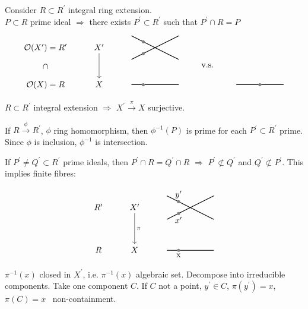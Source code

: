 \documentclass[a4paper,11pt]{article}
\begin{document}
{					Consider $R\subset R^\prime$ integral ring extension.
					\\

					 $P\subset R$ prime ideal $\Longrightarrow$ there exists $P^\prime\subset R^\prime$ such that $P^\prime\cap R=P$
					\begin{equation*}
						\begin{tikzcd}
							\O(X^\prime)=R^\prime \ar[d,phantom,"\rotatebox{90}{$\supset$}",description] & X^\prime\ar[d] & \tikz[baseline=-.1cm]{\draw[thick](-1,.5)--(1,-.5);\draw[thick](-1,-.5)--(1,.5);\draw[thick,gray,fill](-.5,.25)circle[radius=.05cm];\draw[thick,gray,fill](-.5,-.25)circle[radius=.05cm]} & \phantom{l}\ar[d,phantom,"\text{v.s.}",description] & \tikz[baseline=-.1cm]{\draw[thick]plot[smooth] file {plots/xy1.table};\draw[thick]plot[smooth] file {plots/xy2.table}}\\
							\O(X)=R & X & \tikz[baseline=-.1cm]{\draw[thick](-1,0)--(1,0);\draw[thick,gray,fill](-.5,0)circle[radius=.05cm]} & \phantom{l} & \tikz[baseline=-.1cm]{\draw[thick](-1,0)--(1,0);\draw[thick,gray,fill](0,0)circle[radius=.05cm]}
						\end{tikzcd}
					\end{equation*}

					\begin{remark}
						$R\subset R^\prime$ integral extension $\Longrightarrow$ $X^\prime\overset{\pi}{\longrightarrow}X$ surjective.
					\end{remark}

					\begin{remark}
						If $R\overset{\phi}{\longrightarrow}R^\prime$, $\phi$ ring homomorphism, then $\phi^{-1}(P)$ is prime for each $P^\prime\subset R^\prime$ prime. Since $\phi$ is inclusion, $\phi^{-1}$ is intersection.
					\end{remark}

					 If $P^\prime\neq Q^\prime\subset R^\prime$ prime ideals, then $P^\prime\cap R=Q^\prime\cap R$ $\Longrightarrow$ $P^\prime\not\subset Q^\prime$ and $Q^\prime\not\subset P^\prime$. This implies finite fibres:
					\begin{equation*}
						\begin{tikzcd}
							R^\prime  & X^\prime\ar[d,"\pi"] & \tikz[baseline=-.1cm]{\draw[thick](-1,.5)--(1,-.5);\draw[thick](-1,-.5)--(1,.5);\draw[thick,gray,fill](-.5,.25)circle[radius=.05cm];\draw[thick,gray,fill](-.5,-.25)circle[radius=.05cm];\node[above] at (-.5,.25) {$y^\prime$};\node[below] at (-.5,-.25) {$x^\prime$}}\\
							R & X & \tikz[baseline=-.1cm]{\draw[thick](-1,0)--(1,0);\draw[thick,gray,fill](-.5,0)circle[radius=.05cm];\node[below] at (-.5,0) {x}}
						\end{tikzcd}
					\end{equation*}
					$\pi^{-1}(x)$ closed in $X^\prime$, i.e. $\pi^{-1}(x)$ algebraic set. Decompose into irreducible components. Take one component $C$. If $C$ not a point, $y^\prime\in C$, $\pi(y^\prime)=x$, $\pi(C)=x$ \contradiction\ non-containment.
					\\

}
\end{document}
